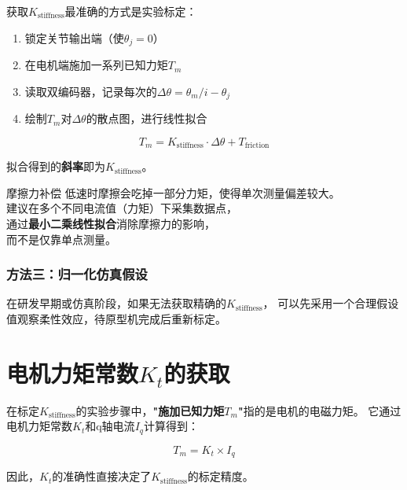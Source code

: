 获取$K_{\text{stiffness}}$最准确的方式是实验标定：

\begin{enumerate}
  \item 锁定关节输出端（使$\theta_j = 0$）
  \item 在电机端施加一系列已知力矩$T_m$
  \item 读取双编码器，记录每次的$\Delta\theta = \theta_m/i - \theta_j$
  \item 绘制$T_m$对$\Delta\theta$的散点图，进行线性拟合
\end{enumerate}

\begin{equation}
T_m = K_{\text{stiffness}} \cdot \Delta\theta + T_{\text{friction}}
\label{eq:stiffness_fit}
\end{equation}

拟合得到的\textbf{斜率}即为$K_{\text{stiffness}}$。

\begin{cautionbox}{摩擦力补偿}
低速时摩擦会吃掉一部分力矩，使得单次测量偏差较大。\\
建议在多个不同电流值（力矩）下采集数据点，\\通过\textbf{最小二乘线性拟合}消除摩擦力的影响，\\而不是仅靠单点测量。
\end{cautionbox}

\subsubsection{方法三：归一化仿真假设}

在研发早期或仿真阶段，如果无法获取精确的$K_{\text{stiffness}}$，\newline
可以先采用一个合理假设值观察柔性效应，待原型机完成后重新标定。

\section{电机力矩常数$K_t$的获取}

在标定$K_{\text{stiffness}}$的实验步骤中，\textbf{"施加已知力矩$T_m$"}指的是电机的电磁力矩。\newline
它通过电机力矩常数$K_t$和q轴电流$I_q$计算得到：

\begin{equation}
T_m = K_t \times I_q
\label{eq:torque_current}
\end{equation}

因此，$K_t$的准确性直接决定了$K_{\text{stiffness}}$的标定精度。

